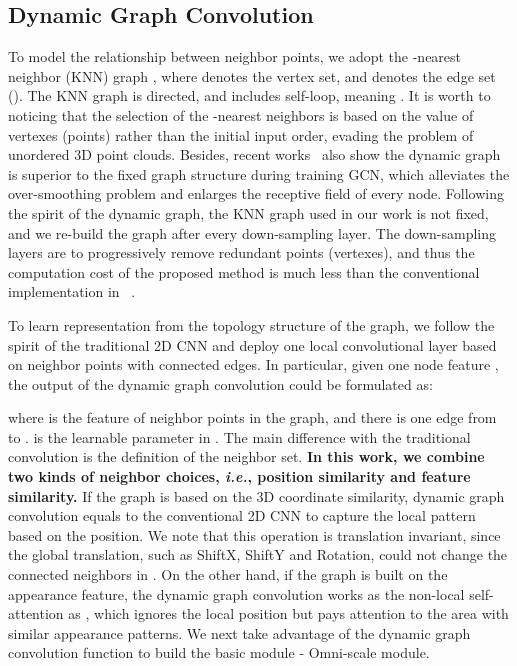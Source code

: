 \documentclass[journal]{IEEEtran}
\def\ie{\emph{i.e.}}
\begin{document}
\subsection{Dynamic Graph Convolution} 
To model the relationship between neighbor points, we adopt the -nearest neighbor (KNN) graph , where  denotes the vertex set, and  denotes the edge set (). The KNN graph is directed, and includes self-loop, meaning . It is worth to noticing that the selection of the  -nearest neighbors is based on the value of vertexes (points) rather than the initial input order, evading the problem of unordered 3D point clouds. 
Besides, recent works~\cite{wang2019dynamic,li2019deepgcns} also show the dynamic graph is superior to the fixed graph structure during training GCN, which alleviates the over-smoothing problem and enlarges the receptive field of every node. 
Following the spirit of the dynamic graph, the KNN graph used in our work is not fixed, and we re-build the graph after every down-sampling layer. The down-sampling layers are to progressively remove redundant points (vertexes), and thus the computation cost of the proposed method is much less than the conventional implementation in ~\cite{wang2019dynamic,li2019deepgcns}. 

To learn representation from the topology structure of the graph, we follow the spirit of the traditional 2D CNN and deploy one local convolutional layer based on neighbor points with connected edges. In particular, given one node feature , the output  of the dynamic graph convolution could be formulated as: 

where  is the feature of neighbor points in the graph, and there is one edge from  to .  is the learnable parameter in . The main difference with the traditional convolution is the definition of the neighbor set. \textbf{In this work, we combine two kinds of neighbor choices, \ie, position similarity and feature similarity.} If the graph  is based on the 3D coordinate similarity, dynamic graph convolution equals to the conventional 2D CNN to capture the local pattern based on the position. We note that this operation is translation invariant, since the global translation, such as ShiftX, ShiftY and Rotation, could not change the connected neighbors in .
On the other hand, if the graph  is built on the appearance feature, the dynamic graph convolution works as the non-local self-attention as \cite{wang2018non,zhang2018self}, which ignores the local position but pays attention to the area with similar appearance patterns. We next take advantage of the dynamic graph convolution function to build the basic module - Omni-scale module. 
\end{document}
